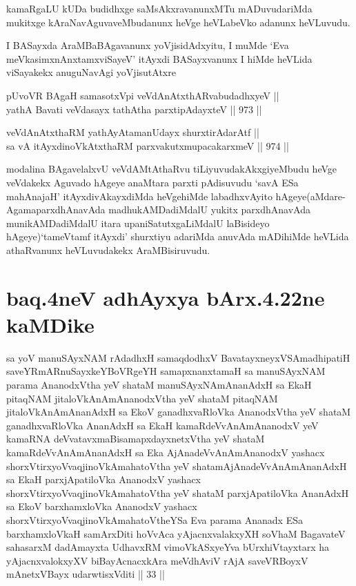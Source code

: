 \begin{artha}
kamaRgaLU kUDa budidhxge saMsAkxravanunxMTu mADuvudariMda mukitxge kAraNavAguvaveMbudanunx heVge heVLabeVko adanunx heVLuvudu.
\end{artha}

\begin{artha}
I BASayxda AraMBaBAgavanunx yoVjisidAdxyitu, I muMde `Eva meVkasimxnAnxtamxviSayeV\mdash  ' itAyxdi BASayxvanunx I hiMde heVLida viSayakekx anuguNavAgi yoVjisutAtxre\ndash 
\end{artha}

\begin{shl}
pUvoVR BAgaH samasotxV\s pi veVdAnAtxthARvabudadhxyeV || \\
yathA Bavati veVdasayx tathA\s tha parxtipAdayxteV \hfill || 973 ||  
\end{shl}
				
\begin{shl}
veVdAnAtxthaRM yathAyAtamanUdayx shurxtirAdarAtf || \\
sa vA itAyxdinoVkAtxthaRM parxvakutxmupacakarxmeV \hfill || 974 ||  
\end{shl}


\begin{artha}
modalina BAgavelalxvU veVdAMtAthaRvu tiLiyuvudakAkxgiyeMbudu heVge veVdakekx Aguvado hAgeye anaMtara parxti pAdisuvudu `savA ESa mahAnajaH' itAyxdivAkayxdiMda heVgehiMde labadhxvAyito hAgeye(aMdare- AgamaparxdhAnavAda madhukAMDadiMdalU yukitx parxdhAnavAda munikAMDadiMdalU itara upaniSatutxgaLiMdalU laBisideyo hAgeye)`tameVtamf itAyxdi' shurxtiyu adariMda anuvAda mADihiMde heVLida athaRvanunx heVLuvudakekx AraMBisiruvudu.
\end{artha}

\section*{baq.4neV adhAyxya bArx.4.22ne kaMDike}

\begin{shl}
sa yoV manuSAyxNAM rAdadhxH samaqdodhxV BavatayxneyxVSAmadhipatiH saveYRmARnuSayxkeYBoVRgeYH samapxnanxtamaH sa manuSAyxNAM parama AnanodxV\s tha yeV shataM manuSAyxNAmAnanAdxH sa EkaH pitaqNAM jitaloVkAnAmAnanodxV\s tha yeV shataM pitaqNAM jitaloVkAnAmAnanAdxH sa EkoV ganadhxvaRloVka AnanodxV\s tha yeV shataM ganadhxvaRloVka AnanAdxH sa EkaH kamaRdeVvAnAmAnanodxV yeV kamaRNA deVvatavxmaBisamapxdayxnetxV\s tha yeV shataM kamaRdeVvAnAmAnanAdxH sa Eka AjAnadeVvAnAmAnanodxV yashacx shorxVtirxyoV\s vaqjinoV\s kAmahatoV\s tha yeV shatamAjAnadeVvAnAmAnanAdxH sa EkaH parxjApatiloVka AnanodxV yashacx shorxVtirxyoV\s vaqjinoV\s kAmahatoV\s tha yeV shataM parxjApatiloVka AnanAdxH sa EkoV barxhamxloVka AnanodxV yashacx shorxVtirxyoV\s vaqjinoV\s kAmahatoV\s theYSa Eva parama Ananadx ESa barxhamxloVkaH samArxDiti hoVvAca yAjacnxvalakxyXH soVhaM BagavateV sahasarxM dadAmayxta UdhavxRM vimoVkASxyeYva bUrxhiVtayxtarx ha yAjacnxvalokxyXV biBayAcnacxkAra meVdhAviV rAjA saveVRBoyxV mAnetxVBayx udarwtisxVditi || 33 ||
\end{shl}

